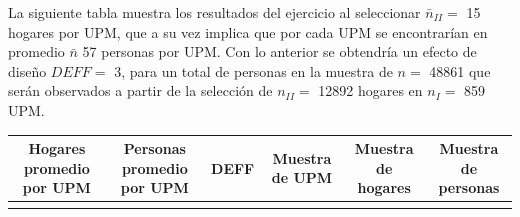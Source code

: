 \documentclass[12pt,spanish,]{book}
\begin{document}
La siguiente tabla muestra los resultados del ejercicio al seleccionar \(\bar{n}_{II} =\) 15 hogares por UPM, que a su vez implica que por cada UPM se encontrarían en promedio \(\bar{n}\) 57 personas por UPM. Con lo anterior se obtendría un efecto de diseño \(DEFF =\) 3, para un total de personas en la muestra de \(n =\) 48861 que serán observados a partir de la selección de \(n_{II} =\) 12892 hogares en \(n_{I} =\) 859 UPM.

\begin{longtable}[]{@{}cccccc@{}}
\toprule
\begin{minipage}[b]{0.16\columnwidth}\centering
Hogares promedio por UPM\strut
\end{minipage} & \begin{minipage}[b]{0.19\columnwidth}\centering
Personas promedio por UPM\strut
\end{minipage} & \begin{minipage}[b]{0.09\columnwidth}\centering
DEFF\strut
\end{minipage} & \begin{minipage}[b]{0.13\columnwidth}\centering
Muestra de UPM\strut
\end{minipage} & \begin{minipage}[b]{0.13\columnwidth}\centering
Muestra de hogares\strut
\end{minipage} & \begin{minipage}[b]{0.13\columnwidth}\centering
Muestra de personas\strut
\end{minipage}\tabularnewline
\midrule
\endhead
\begin{minipage}[t]{0.16\columnwidth}\centering
15\strut
\end{minipage} & \begin{minipage}[t]{0.19\columnwidth}\centering
57\strut
\end{minipage} & \begin{minipage}[t]{0.09\columnwidth}\centering
3\strut
\end{minipage} & \begin{minipage}[t]{0.13\columnwidth}\centering
859\strut
\end{minipage} & \begin{minipage}[t]{0.13\columnwidth}\centering
12892\strut
\end{minipage} & \begin{minipage}[t]{0.13\columnwidth}\centering
48861\strut
\end{minipage}\tabularnewline
\bottomrule
\end{longtable}
\end{document}
